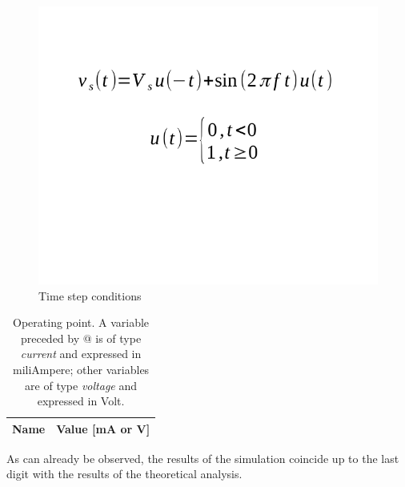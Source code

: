 \begin{figure}[h] \centering
\includegraphics[width=0.5\linewidth]{time_step.pdf}
\caption{Time step conditions}
\label{fig:time_step}
\end{figure}

\begin{table}[h]
  \centering
  \begin{tabular}{|l|r|}
    \hline    
    {\bf Name} & {\bf Value [mA or V]} \\ \hline
    
  \end{tabular}
  \caption{Operating point. A variable preceded by @ is of type {\em current}
    and expressed in miliAmpere; other variables are of type {\it voltage} and expressed in
    Volt.}
  \label{tab:op}
\end{table}

As can already be observed, the results of the simulation coincide up to the last digit with the results of the theoretical analysis.
